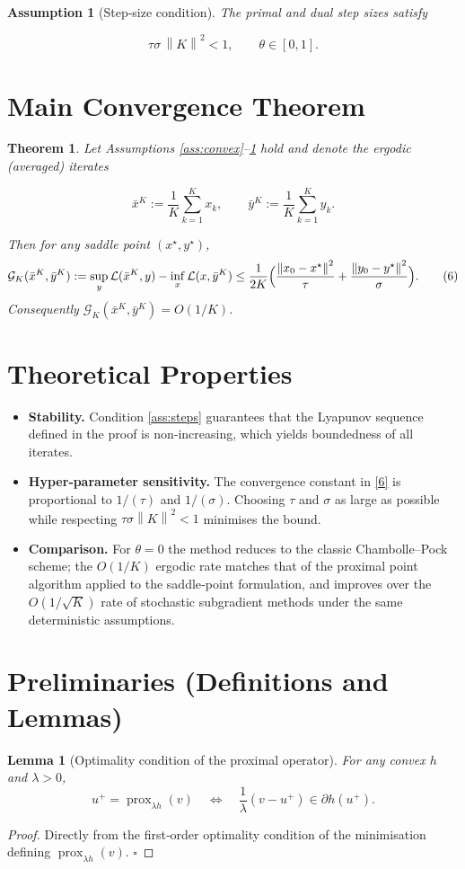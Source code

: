 \documentclass{article}
\newtheorem{theorem}{Theorem}
\newtheorem{lemma}{Lemma}
\newtheorem{assumption}{Assumption}
\newcommand{\prox}[2]{\operatorname{prox}_{#1}\!\left(#2\right)}
\newcommand{\norm}[1]{\left\|#1\right\|}
\begin{document}
\begin{assumption}[Step‑size condition]\label{ass:steps}
The primal and dual step sizes satisfy  

\[
\tau\sigma\,\norm{K}^{2}<1,\qquad \theta\in[0,1].
\tag{5}
\]
\end{assumption}

\section*{Main Convergence Theorem}
\begin{theorem}\label{thm:ergodic}
Let Assumptions \ref{ass:convex}–\ref{ass:steps} hold and denote the ergodic (averaged) iterates  

\[
\bar x^{K}:=\frac{1}{K}\sum_{k=1}^{K}x_{k},\qquad
\bar y^{K}:=\frac{1}{K}\sum_{k=1}^{K}y_{k}.
\]

Then for any saddle point $(x^{\star},y^{\star})$,
\[
\mathcal G_{K}(\bar x^{K},\bar y^{K})
:=\sup_{y}\mathcal L(\bar x^{K},y)-\inf_{x}\mathcal L(x,\bar y^{K})
\le
\frac{1}{2K}\Bigl(
\frac{\norm{x_{0}-x^{\star}}^{2}}{\tau}
+\frac{\norm{y_{0}-y^{\star}}^{2}}{\sigma}
\Bigr).
\tag{6}
\]
Consequently $\mathcal G_{K}(\bar x^{K},\bar y^{K})=O(1/K)$.
\end{theorem}

\section*{Theoretical Properties}
\begin{itemize}[nosep]
\item \textbf{Stability.} Condition \eqref{ass:steps} guarantees that the Lyapunov sequence defined in the proof is non‑increasing, which yields boundedness of all iterates.
\item \textbf{Hyper‑parameter sensitivity.} The convergence constant in \eqref{6} is proportional to $1/(\tau)$ and $1/(\sigma)$. Choosing $\tau$ and $\sigma$ as large as possible while respecting $\tau\sigma\norm{K}^{2}<1$ minimises the bound.
\item \textbf{Comparison.} For $\theta=0$ the method reduces to the classic Chambolle–Pock scheme; the $O(1/K)$ ergodic rate matches that of the proximal point algorithm applied to the saddle‑point formulation, and improves over the $O(1/\sqrt{K})$ rate of stochastic subgradient methods under the same deterministic assumptions.
\end{itemize}

\section*{Preliminaries (Definitions and Lemmas)}
\begin{lemma}[Optimality condition of the proximal operator]\label{lem:prox-opt}
For any convex $h$ and $\lambda>0$,
\[
u^{+}= \prox{\lambda h}{v}\quad\Longleftrightarrow\quad 
\frac{1}{\lambda}(v-u^{+})\in\partial h(u^{+}).
\tag{7}
\]
\end{lemma}
\begin{proof}
Directly from the first‑order optimality condition of the minimisation defining $\prox{\lambda h}{v}$. \hfill $\square$
\end{proof}
\end{document}
